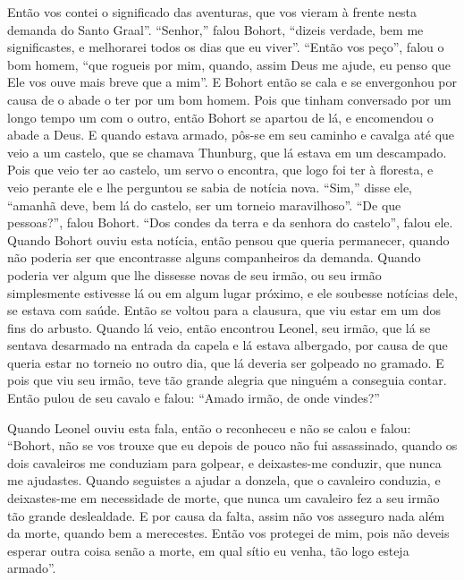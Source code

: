  Então vos contei o significado das aventuras, que vos vieram à frente nesta
demanda do Santo Graal”. “Senhor,” falou Bohort, “dizeis
verdade, bem me significastes, e melhorarei todos os dias que eu viver”. “Então
vos peço”, falou o bom homem, “que rogueis por mim, quando, assim Deus me
ajude, eu penso que Ele vos ouve mais breve que a mim”. E Bohort então se cala
e se envergonhou por causa de o abade o ter por um bom homem. Pois que tinham
conversado por um longo tempo um com o outro, então Bohort se apartou de lá, e
encomendou o abade a Deus. E quando estava armado, pôs-se em seu caminho e
cavalga até que veio a um castelo, que se chamava Thunburg, que lá estava em um
descampado. Pois que veio ter ao castelo, um servo o encontra, que logo foi ter
à floresta, e veio perante ele e lhe perguntou se sabia de notícia nova. “Sim,”
disse ele, “amanhã deve, bem lá do castelo, ser um torneio maravilhoso”. “De
que pessoas?”, falou Bohort. “Dos condes da terra e da senhora do castelo”,
falou ele. Quando Bohort ouviu esta notícia, então pensou que queria
permanecer, quando não poderia ser que encontrasse alguns companheiros da
demanda. Quando poderia ver algum que lhe dissesse novas de seu irmão, ou seu
irmão simplesmente estivesse lá ou em algum lugar próximo, e ele soubesse
notícias dele, se estava com saúde. Então se voltou para a clausura, que viu
estar em um dos fins do arbusto. Quando lá veio, então encontrou Leonel, seu
irmão, que lá se sentava desarmado na entrada da capela e lá estava albergado,
por causa de que queria estar no torneio no outro dia, que lá deveria ser
golpeado no gramado. E pois que viu seu irmão, teve tão grande alegria que
ninguém a conseguia contar. Então pulou de seu cavalo e falou: “Amado irmão, de
onde vindes?”

Quando Leonel ouviu esta fala, então o reconheceu e não se calou e falou:
“Bohort, não se vos trouxe que eu depois de pouco não fui assassinado, quando
os dois cavaleiros me conduziam para golpear, e deixastes-me conduzir, que
nunca me ajudastes. Quando seguistes a ajudar a donzela, que o cavaleiro
conduzia, e deixastes-me em necessidade de morte, que nunca um cavaleiro fez a
seu irmão tão grande deslealdade. E por causa da falta, assim não vos asseguro
nada além da morte, quando bem a merecestes. Então vos protegei de mim, pois
não deveis esperar outra coisa senão a morte, em qual sítio eu venha, tão logo
esteja armado”.

